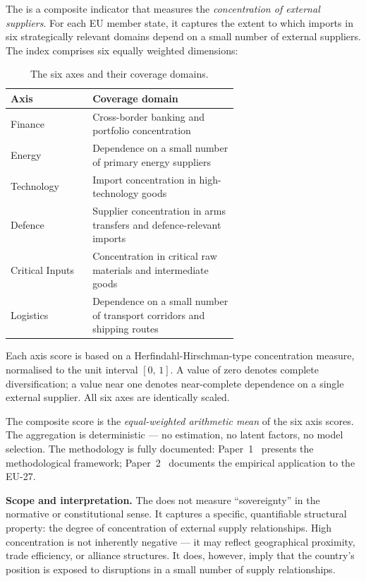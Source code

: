 The \ISI is a composite indicator that measures the
\emph{concentration of external suppliers}.  For each EU member
state, it captures the extent to which imports in six strategically
relevant domains depend on a small number of external suppliers.
The index comprises six equally weighted dimensions:

\begin{table}[htbp]
\centering\small
\caption{The six \ISI axes and their coverage domains.}
\label{tab:axes}
\begin{tabular}{@{}lp{0.64\linewidth}@{}}
\toprule
\textbf{Axis} & \textbf{Coverage domain} \\
\midrule
Finance &
  Cross-border banking and portfolio
  concentration \\
Energy &
  Dependence on a small number of primary
  energy suppliers \\
Technology &
  Import concentration in
  high-technology goods \\
Defence &
  Supplier concentration in arms transfers and
  defence-relevant imports \\
Critical Inputs &
  Concentration in critical raw materials and
  intermediate goods \\
Logistics &
  Dependence on a small number of transport
  corridors and shipping routes \\
\bottomrule
\end{tabular}
\end{table}

Each axis score is based on a Herfindahl-Hirschman-type
concentration measure, normalised to the unit interval
$[0,\,1]$.  A value of zero denotes complete
diversification; a value near one denotes near-complete
dependence on a single external supplier.  All six
axes are identically scaled.

The composite score is the \emph{equal-weighted arithmetic
mean} of the six axis scores.  The aggregation is
deterministic --- no estimation, no latent factors,
no model selection.  The methodology is fully documented:
Paper~1~\cite{isi_paper1} presents the methodological
framework; Paper~2~\cite{isi_paper2} documents the empirical
application to the EU-27.

\textbf{Scope and interpretation.}
The \ISI does not measure ``sovereignty'' in the normative or
constitutional sense.  It captures a specific, quantifiable
structural property: the degree of concentration of external
supply relationships.  High concentration is not inherently
negative --- it may reflect geographical proximity, trade
efficiency, or alliance structures.  It does, however, imply
that the country's position is exposed to disruptions in a
small number of supply relationships.


